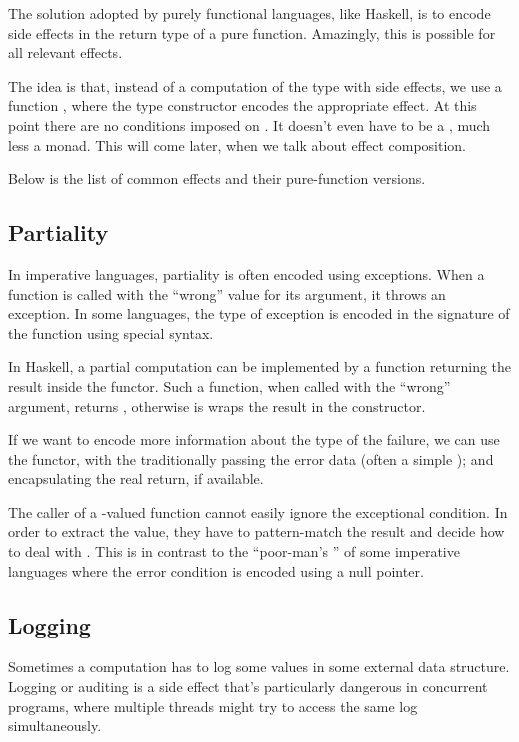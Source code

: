 \documentclass[DaoFP]{subfiles}
\begin{document}
The solution adopted by purely functional languages, like Haskell, is to encode side effects in the return type of a pure function. Amazingly, this is possible for all relevant effects. 

The idea is that, instead of a computation of the type  with side effects, we use a function , where the type constructor  encodes the appropriate effect. At this point there are no conditions imposed on . It doesn't even have to be a , much less a monad. This will come later, when we talk about effect composition.

Below is the list of common effects and their pure-function versions.

\subsection{Partiality}
In imperative languages, partiality is often encoded using exceptions. When a function is called with the ``wrong'' value for its argument, it throws an exception. In some languages, the type of exception is encoded in the signature of the function using special syntax. 

In Haskell, a partial computation can be implemented by a function returning the result inside the  functor. Such a function, when called with the ``wrong'' argument, returns , otherwise is wraps the result in the  constructor.

If we want to encode more information about the type of the failure, we can use the  functor, with the  traditionally passing the error data (often a simple ); and  encapsulating the real return, if available.

The caller of a -valued function cannot easily ignore the exceptional condition. In order to extract the value, they have to pattern-match the result and decide how to deal with . This is in contrast to the ``poor-man's '' of some imperative languages where the error condition is encoded using a null pointer.

\subsection{Logging}

Sometimes a computation has to log some values in some external data structure. Logging or auditing is a side effect that's particularly dangerous in concurrent programs, where multiple threads might try to access the same log simultaneously.
\end{document}
